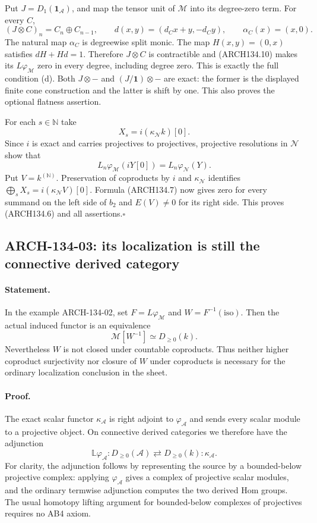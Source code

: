 Put $J=D_1(\mathbf1_{\mathcal A})$, and map the tensor unit of
$\mathcal M$ into its degree-zero term.  For every $C$,
\[
 (J\otimes C)_n=C_n\oplus C_{n-1},\qquad
 d(x,y)=(d_Cx+y,-d_Cy),\qquad \alpha_C(x)=(x,0).
\]
The natural map $\alpha_C$ is degreewise split monic.  The map
$H(x,y)=(0,x)$ satisfies $dH+Hd=1$.  Therefore
$J\otimes C$ is contractible and (ARCH134.10) makes its
$L\varphi_{\mathcal M}$ zero in every degree, including degree zero.
This is exactly the full condition (d).  Both $J\otimes-$ and
$(J/\mathbf1)\otimes-$ are exact: the former is the displayed finite
cone construction and the latter is shift by one.  This also proves
the optional flatness assertion.

For each $s\in\mathbb N$ take
\[
                        X_s=i(\kappa_{\mathcal N}k)[0].
\]
Since $i$ is exact and carries projectives to projectives, projective
resolutions in $\mathcal N$ show that
\[
 L_n\varphi_{\mathcal M}(iY[0])
                         =L_n\varphi_{\mathcal N}(Y).
 \tag{ARCH134.11}
\]
Put $V=k^{(\mathbb N)}$.  Preservation of coproducts by $i$ and
$\kappa_{\mathcal N}$ identifies
$\bigoplus_sX_s=i(\kappa_{\mathcal N}V)[0]$.  Formula (ARCH134.7)
now gives zero for every summand on the left side of $b_2$ and
$E(V)\ne0$ for its right side.  This proves (ARCH134.6) and all
assertions.\hfill$\square$

\subsection{ARCH-134-03: its localization is still the connective derived category}

\paragraph{Statement.}
In the example ARCH-134-02, set
$F=L\varphi_{\mathcal M}$ and $W=F^{-1}(\mathrm{iso})$.
Then the actual induced functor is an equivalence
\[
                         \mathcal M[W^{-1}]\simeq D_{\ge0}(k).
 \tag{ARCH134.12}
\]
Nevertheless $W$ is not closed under countable coproducts.  Thus neither
higher coproduct surjectivity nor closure of $W$ under coproducts is
necessary for the ordinary localization conclusion in the sheet.

\paragraph{Proof.}
The exact scalar functor $\kappa_{\mathcal A}$ is right adjoint to
$\varphi_{\mathcal A}$ and sends every scalar module to a projective
object.  On connective derived categories we therefore have the
adjunction
\[
 \mathbb L\varphi_{\mathcal A}:D_{\ge0}(\mathcal A)
       \rightleftarrows D_{\ge0}(k):\kappa_{\mathcal A}.
 \tag{ARCH134.13}
\]
For clarity, the adjunction follows by representing the source by a
bounded-below projective complex: applying $\varphi_{\mathcal A}$
gives a complex of projective scalar modules, and the ordinary
termwise adjunction computes the two derived Hom groups.  The usual
homotopy lifting argument for bounded-below complexes of projectives
requires no AB4 axiom.

